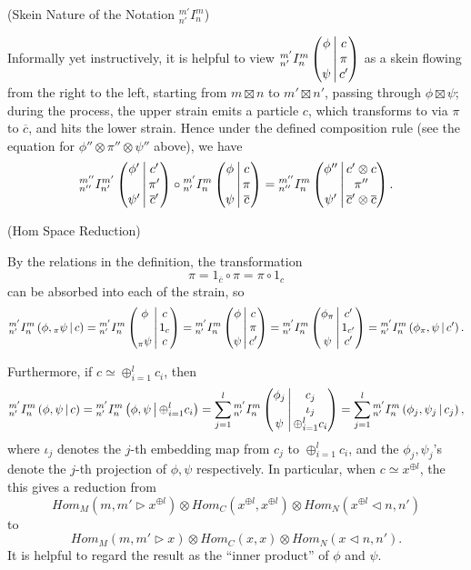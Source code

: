 \begin{remark}\label{remark/skein-nature-of-the-notation-I} (Skein Nature of the Notation ${}^{m'}_{n'}I^{m}_{n}$)

  \noindent Informally yet instructively, it is helpful to view
  ${}^{m'}_{n'} I^{m}_{n} \left( \begin{matrix} \phi \\ {}\\ \psi \end{matrix} \,\middle|\, \begin{matrix} c \\ \pi \\ c' \end{matrix} \right)$ as a skein flowing from the
  right to the left, starting from $m \boxtimes n$ to $m' \boxtimes n'$,
  passing through $\phi \boxtimes \psi$; during the process, the upper strain
  emits a particle $c$, which transforms to via $\pi$ to $\overline{c}$, and
  hits the lower strain. Hence under the defined composition rule (see the
  equation for $\phi'' \otimes \pi'' \otimes \psi''$ above), we have
  \[
    {}^{m''}_{n''} I^{m'}_{n'} \left( \begin{matrix} \phi' \\ {}\\ \psi' \end{matrix} \,\middle|\, \begin{matrix} c' \\ \pi' \\ \overline{c}' \end{matrix} \right) \circ
    {}^{m'}_{n'} I^{m}_{n} \left( \begin{matrix} \phi \\ {}\\ \psi \end{matrix} \,\middle|\, \begin{matrix} c \\ \pi \\ \overline{c} \end{matrix} \right) =
    {}^{m''}_{n''} I^{m}_{n} \left( \begin{matrix} \phi'' \\ {}\\ \psi' \end{matrix} \,\middle|\, \begin{matrix} c' \otimes c \\ \pi'' \\ \overline{c}' \otimes \overline{c} \end{matrix} \right).
  \]
\end{remark}

\begin{remark}\label{remark/hom-space-reduction} (Hom Space Reduction)

  \noindent By the relations in the definition, the transformation
  \[
    \pi = 1_{\overline{c}} \circ \pi = \pi \circ 1_{c}
  \]
  can be absorbed into each of the strain, so
  \[
    {}^{m'}_{n'} I^{m}_{n} \left( \phi, {}_{\pi}\psi \,\middle|\, c \right) =
    {}^{m'}_{n'} I^{m}_{n} \left( \begin{matrix} \phi \\ {}\\ {}_{\pi}\psi \end{matrix} \,\middle|\, \begin{matrix} c \\ 1_{c} \\ c \end{matrix} \right) =
    {}^{m'}_{n'} I^{m}_{n} \left( \begin{matrix} \phi \\ {}\\ \psi \end{matrix} \,\middle|\, \begin{matrix} c \\ \pi \\ c' \end{matrix} \right) =
    {}^{m'}_{n'} I^{m}_{n} \left( \begin{matrix} \phi_{\pi} \\ {}\\ \psi \end{matrix} \,\middle|\, \begin{matrix} c' \\ 1_{c'} \\ c' \end{matrix} \right) =
    {}^{m'}_{n'} I^{m}_{n} \left( \phi_{\pi}, \psi \,\middle|\, c' \right).
  \]

  \noindent Furthermore, if $c \simeq \oplus_{i=1}^{l} c_{i}$, then
  \[
    {}^{m'}_{n'} I^{m}_{n} \left( \phi, \psi \,\middle|\, c \right) = {}^{m'}_{n'} I^{m}_{n} \left( \phi, \psi \,\middle|\, \oplus_{i=1}^{l} c_{i} \right) = \sum_{j=1}^{l} {}^{m'}_{n'} I^{m}_{n} \left( \begin{matrix} \phi_{j} \\ {}\\ \psi \end{matrix} \,\middle|\, \begin{matrix} c_{j} \\ \iota_{j} \\ \oplus_{i=1}^{l} c_{i} \end{matrix} \right) =
    \sum_{j=1}^{l}{}^{m'}_{n'} I^{m}_{n} \left( \phi_{j}, \psi_{j} \,\middle|\, c_{j} \right),
  \]
  where $\iota_{j}$ denotes the $j$-th embedding map from $c_{j}$ to
  $\oplus_{i=1}^{l}c_{i}$, and the $\phi_{j}, \psi_{j}$'s denote the $j$-th
  projection of $\phi, \psi$ respectively. In particular, when
  $c \simeq x^{\oplus l}$, the this gives a reduction from
  \[
    Hom_{M}(m, m' \rhd x^{\oplus l}) \otimes Hom_{C}(x^{\oplus l}, x^{\oplus l}) \otimes Hom_{N} (x^{\oplus l} \lhd n, n')
  \]
  to
  \[
    Hom_{M}(m, m' \rhd x) \otimes Hom_{C}(x, x) \otimes Hom_{N} (x \lhd n, n').
  \]
  It is helpful to regard the result as the ``inner product'' of $\phi$ and $\psi$.
\end{remark}

